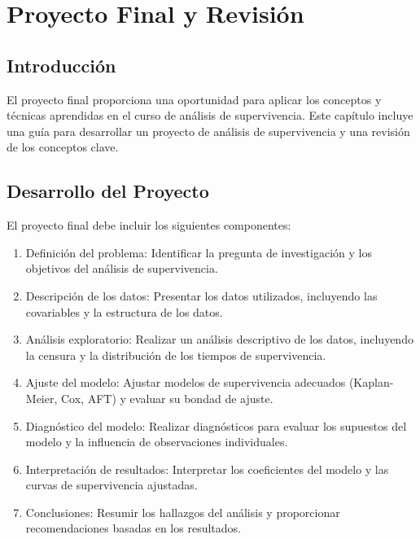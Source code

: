\documentclass[a4paper]{report} %
\begin{document}
\chapter{Proyecto Final y Revisi\'on}

\section{Introducci\'on}
El proyecto final proporciona una oportunidad para aplicar los conceptos y t\'ecnicas aprendidas en el curso de an\'alisis de supervivencia. Este cap\'itulo incluye una gu\'ia para desarrollar un proyecto de an\'alisis de supervivencia y una revisi\'on de los conceptos clave.

\section{Desarrollo del Proyecto}
El proyecto final debe incluir los siguientes componentes:
\begin{enumerate}
    \item Definici\'on del problema: Identificar la pregunta de investigaci\'on y los objetivos del an\'alisis de supervivencia.
    \item Descripci\'on de los datos: Presentar los datos utilizados, incluyendo las covariables y la estructura de los datos.
    \item An\'alisis exploratorio: Realizar un an\'alisis descriptivo de los datos, incluyendo la censura y la distribuci\'on de los tiempos de supervivencia.
    \item Ajuste del modelo: Ajustar modelos de supervivencia adecuados (Kaplan-Meier, Cox, AFT) y evaluar su bondad de ajuste.
    \item Diagn\'ostico del modelo: Realizar diagn\'osticos para evaluar los supuestos del modelo y la influencia de observaciones individuales.
    \item Interpretaci\'on de resultados: Interpretar los coeficientes del modelo y las curvas de supervivencia ajustadas.
    \item Conclusiones: Resumir los hallazgos del an\'alisis y proporcionar recomendaciones basadas en los resultados.
\end{enumerate}
\end{document}
